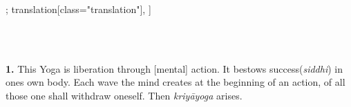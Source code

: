 \documentclass[12pt]{article}%
\def\om{\textrm{\footnotesize \textit{omitted in}\ }} %
\begin{document}
\begin{alignment}[
    texts=edition[class="edition"];
    translation[class="translation"],
    ]
\begin{edition}
\begin{tlg}
\\
\\
\end{tlg}
\end{edition}
\begin{translation}
\begin{tlate}\textbf{1.} This Yoga is liberation through [mental] action. It bestows success(\textit{siddhi}) in ones own body. Each wave the mind creates at the beginning of an action, of all those one shall withdraw oneself. Then \textit{kriyāyoga} arises. \bigskip \bigskip \end{tlate}
\end{translation}
  \begin{edition}
    \begin{tlg}

\end{tlg}
\end{edition}
\end{alignment}
\end{document}
